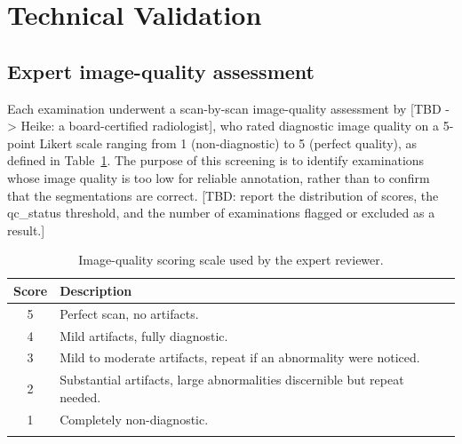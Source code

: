 
\section*{Technical Validation}\label{sec:validation}

\subsection*{Expert image-quality assessment}\label{subsec:imgqc}
Each examination underwent a scan-by-scan image-quality assessment by [TBD -> Heike: a board-certified radiologist], who rated diagnostic image quality on a 5-point Likert scale ranging from 1 (non-diagnostic) to 5 (perfect quality), as defined in Table~\ref{tab:qc}.
The purpose of this screening is to identify examinations whose image quality is too low for reliable annotation, rather than to confirm that the segmentations are correct.
[TBD: report the distribution of scores, the qc\_status threshold, and the number of examinations flagged or excluded as a result.]

\begin{table}[h]
\caption{Image-quality scoring scale used by the expert reviewer.}\label{tab:qc}
\begin{tabular}{@{}cl@{}}
\toprule
Score & Description \\
\midrule
5 & Perfect scan, no artifacts. \\
4 & Mild artifacts, fully diagnostic. \\
3 & Mild to moderate artifacts, repeat if an abnormality were noticed. \\
2 & Substantial artifacts, large abnormalities discernible but repeat needed. \\
1 & Completely non-diagnostic. \\
\botrule
\end{tabular}
\end{table}

